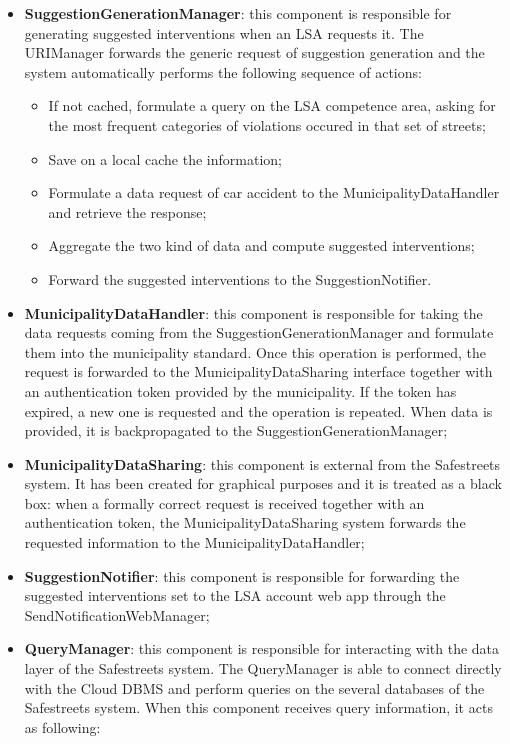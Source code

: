 \begin{itemize}
    \item \textbf{SuggestionGenerationManager}: this component is responsible for generating suggested interventions when an LSA requests it. The URIManager forwards the generic request of suggestion generation and the system automatically performs the following sequence of actions: 
    \begin{itemize}
        \item If not cached, formulate a query on the LSA competence area, asking for the most frequent categories of violations occured in that set of streets;
        \item Save on a local cache the information;
        \item Formulate a data request of car accident to the MunicipalityDataHandler and retrieve the response;
        \item Aggregate the two kind of data and compute suggested interventions;
        \item Forward the suggested interventions to the SuggestionNotifier.
    \end{itemize}
    \item \textbf{MunicipalityDataHandler}: this component is responsible for taking the data requests coming from the SuggestionGenerationManager and formulate them into the municipality standard. Once this operation is performed, the request is forwarded to the MunicipalityDataSharing interface together with an authentication token provided by the municipality. If the token has expired, a new one is requested and the operation is repeated. When data is provided, it is backpropagated to the SuggestionGenerationManager;
    \item \textbf{MunicipalityDataSharing}: this component is external from the Safestreets system. It has been created for graphical purposes and it is treated as a black box: when a formally correct request is received together with an authentication token, the MunicipalityDataSharing system forwards the requested information to the MunicipalityDataHandler;
    \item \textbf{SuggestionNotifier}: this component is responsible for forwarding the suggested interventions set to the LSA account web app through the SendNotificationWebManager;
    \item \textbf{QueryManager}: this component is responsible for interacting with the data layer of the Safestreets system. The QueryManager is able to connect directly with the Cloud DBMS and perform queries on the several databases of the Safestreets system. When this component receives query information, it acts as following: 

\end{itemize}
